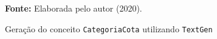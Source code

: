 \begin{figure}[ht!]
\centering

\caption{\textmd{Geração do conceito \texttt{CategoriaCota} utilizando \texttt{TextGen}}}
\label{fig:texgen}

\par\medskip\textbf{Fonte:} Elaborada pelo autor (2020). \par\medskip

\end{figure}

